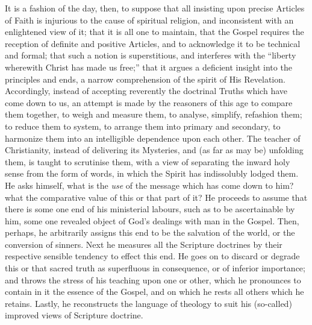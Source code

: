 It is a fashion of the day, then, to suppose that all insisting upon
precise Articles of Faith is injurious to the cause of spiritual
religion, and inconsistent with an enlightened view of it; that it is
all one to maintain, that the Gospel requires the reception of definite
and positive Articles, and to acknowledge it to be technical and formal;
that such a notion is superstitious, and interferes with the
``liberty wherewith Christ has made us free;'' that it argues a
deficient insight into the principles and ends, a narrow comprehension
of the spirit of His Revelation. Accordingly, instead of accepting
reverently the doctrinal Truths which have come down to us, an attempt
is made by the reasoners of this age to compare them together, to weigh
and measure them, to analyse, simplify, refashion them; to reduce them
to system, to arrange them into primary and secondary, to harmonize them
into an intelligible dependence upon each other. The teacher of
Christianity, instead of delivering its Mysteries, and (as far as may
be) unfolding them, is taught to scrutinise them, with a view of
separating the inward holy sense from the form of words, in which the
Spirit has indissolubly lodged them. He asks himself, what is the \emph{use}
of the message which has come down to him? what the comparative value of
this or that part of it? He proceeds to assume that there is some one
end of his ministerial labours, such as to be ascertainable by him, some
one revealed object of God's dealings with man in the Gospel. Then,
perhaps, he arbitrarily assigns this end to be the salvation of the
world, or the conversion of sinners. Next he measures all the Scripture
doctrines by their respective sensible tendency to effect this end. He
goes on to discard or degrade this or that sacred truth as superfluous
in consequence, or of inferior importance; and throws the stress of his
teaching upon one or other, which he pronounces to contain in it the
essence of the Gospel, and on which he rests all others which he
retains. Lastly, he reconstructs the language of theology to suit his
(so-called) improved views of Scripture doctrine.


